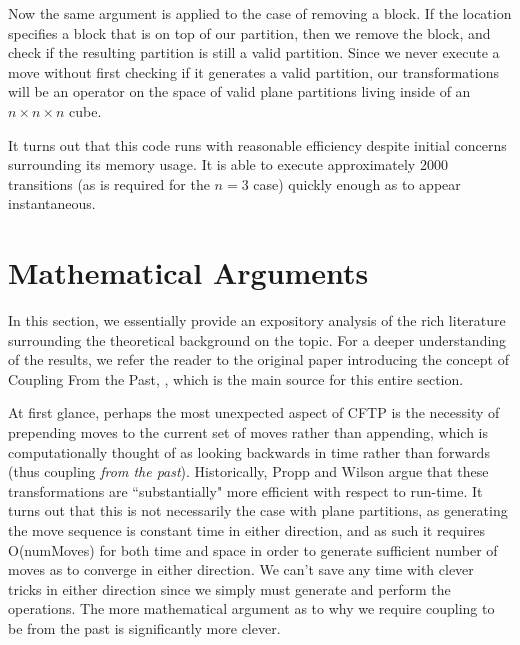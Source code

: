 Now the same argument is applied to the case of removing a block. If the location specifies a block that is on top of our partition, then we remove the block, and check if the resulting partition is still a valid partition. Since we never execute a move without first checking if it generates a valid partition, our transformations will be an operator on the space of valid plane partitions living inside of an $n\times n\times n$ cube.

It turns out that this code runs with reasonable efficiency despite initial concerns surrounding its memory usage. It is able to execute approximately 2000 transitions (as is required for the $n=3$ case) quickly enough as to appear instantaneous.
\section{Mathematical Arguments}\label{proof}

% 
In this section, we essentially provide an expository analysis of the rich literature surrounding the theoretical background on the topic. For a deeper understanding of the results, we refer the reader to the original paper introducing the concept of Coupling From the Past, \cite{propp}, which is the main source for this entire section.

At first glance, perhaps the most unexpected aspect of CFTP is the necessity of prepending moves to the current set of moves rather than appending, which is computationally thought of as looking backwards in time rather than forwards (thus coupling \emph{from the past}). Historically, Propp and Wilson argue that these transformations are ``substantially" more efficient with respect to run-time. It turns out that this is not necessarily the case with plane partitions, as generating the move sequence is constant time in either direction, and as such it requires O(numMoves) for both time and space in order to generate sufficient number of moves as to converge in either direction. We can't save any time with clever tricks in either direction since we simply must generate and perform the operations. The more mathematical argument as to why we require coupling to be from the past is significantly more clever.


